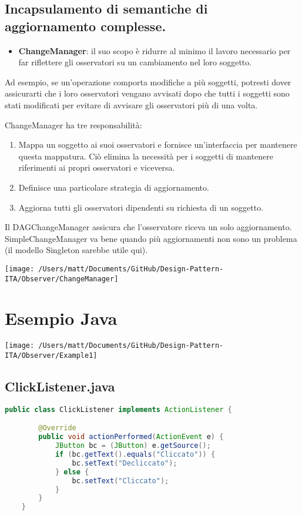 \subsection{Incapsulamento di semantiche di aggiornamento complesse.}

\begin{itemize}
    \item \textbf{ChangeManager}: il suo scopo è ridurre al minimo il lavoro necessario per far riflettere gli osservatori su un cambiamento nel loro soggetto.
\end{itemize}

Ad esempio, se un'operazione comporta modifiche a più soggetti, potresti dover assicurarti che i loro osservatori vengano avvisati dopo che tutti i soggetti sono stati modificati per evitare di avvisare gli osservatori più di una volta.

ChangeManager ha tre responsabilità:

    \begin{enumerate}
        \item Mappa un soggetto ai suoi osservatori e fornisce un'interfaccia per mantenere questa mappatura. Ciò elimina la necessità per i soggetti di mantenere riferimenti ai propri osservatori e viceversa.

        \item Definisce una particolare strategia di aggiornamento.

        \item Aggiorna tutti gli osservatori dipendenti su richiesta di un soggetto.
    \end{enumerate}

Il DAGChangeManager assicura che l'osservatore riceva un solo aggiornamento. SimpleChangeManager va bene quando più aggiornamenti non sono un problema (il modello Singleton sarebbe utile qui).

\texttt{[image: /Users/matt/Documents/GitHub/Design-Pattern-ITA/Observer/ChangeManager]}


\section{Esempio Java}
\texttt{[image: /Users/matt/Documents/GitHub/Design-Pattern-ITA/Observer/Example1]}

\subsection{ClickListener.java}
\begin{lstlisting}[language=java]
    public class ClickListener implements ActionListener {

        @Override
        public void actionPerformed(ActionEvent e) {
            JButton bc = (JButton) e.getSource();
            if (bc.getText().equals("Cliccato")) {
                bc.setText("Decliccato");
            } else {
                bc.setText("Cliccato");
            }
        }
    }
\end{lstlisting}

